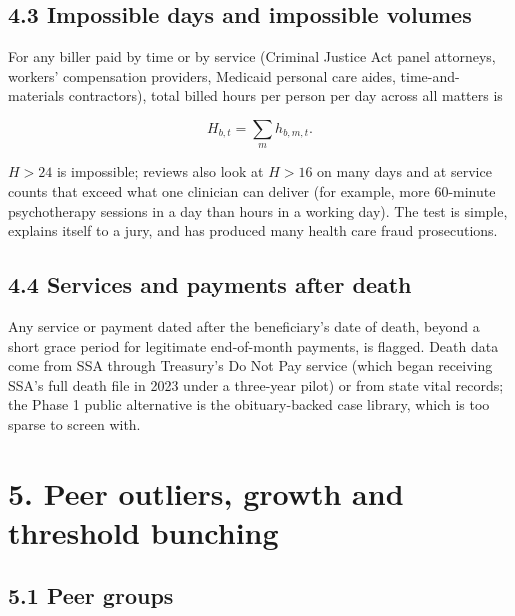 \documentclass[letterpaper,11pt]{article}
\begin{document}
\hypertarget{impossible-days-and-impossible-volumes}{%
\subsection*{4.3 Impossible days and impossible
volumes}\label{impossible-days-and-impossible-volumes}}

For any biller paid by time or by service (Criminal Justice Act panel
attorneys, workers' compensation providers, Medicaid personal care
aides, time-and-materials contractors), total billed hours per person
per day across all matters is

\[H_{b,t} = \sum_{m} h_{b,m,t}.\]

\(H > 24\) is impossible; reviews also look at \(H > 16\) on many days
and at service counts that exceed what one clinician can deliver (for
example, more 60-minute psychotherapy sessions in a day than hours in a
working day). The test is simple, explains itself to a jury, and has
produced many health care fraud prosecutions.

\hypertarget{services-and-payments-after-death}{%
\subsection*{4.4 Services and payments after
death}\label{services-and-payments-after-death}}

Any service or payment dated after the beneficiary's date of death,
beyond a short grace period for legitimate end-of-month payments, is
flagged. Death data come from SSA through Treasury's Do Not Pay service
(which began receiving SSA's full death file in 2023 under a three-year
pilot) or from state vital records; the Phase 1 public alternative is
the obituary-backed case library, which is too sparse to screen with.

\hypertarget{peer-outliers-growth-and-threshold-bunching}{%
\section*{5. Peer outliers, growth and threshold
bunching}\label{peer-outliers-growth-and-threshold-bunching}}

\hypertarget{peer-groups}{%
\subsection*{5.1 Peer groups}\label{peer-groups}}
\end{document}
